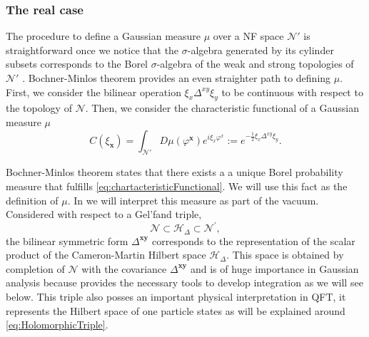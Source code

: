 \documentclass{elsarticle}%
\begin{document}
\subsubsection{The real case}
The procedure to define a Gaussian measure $\mu$ over a  NF space $\mathcal{N}'$ is straightforward once we notice that the $\sigma$-algebra generated by its cylinder subsets corresponds to the Borel $\sigma$-algebra of the weak and strong topologies of $\mathcal{N}'$  \cite{kuoWhiteNoise1996}. Bochner-Minlos theorem  \cite{hidaBrownianMotion1980,gelfandGeneralizedFunctions1964} provides an even straighter path to defining $\mu$.  First, we consider the bilinear operation ${\xi}_x\Delta^{xy}\xi_y$ to be continuous   with respect to the topology of $\mathcal{N}$.  Then, we consider the  characteristic functional of a Gaussian measure $\mu$
\begin{equation}
    \label{eq:chartacteristicFunctional}
        C(\xi_{\mathbf{x}})=\int_{\mathcal{N}'}D\mu(\varphi^{\mathbf{x}}) e^{i\xi_x\varphi^x} :=e^{-\frac{1}{2}{\xi}_x\Delta^{xy}\xi_y}.
\end{equation}

Bochner-Minlos theorem states that there exists a 
 a unique Borel probability measure that fulfills \eqref{eq:chartacteristicFunctional}. We will use this fact as the definition of $\mu$. In \cite{alonsoGeometricFlavours2024} we will interpret this measure as part of the vacuum.
Considered with respect to a Gel'fand triple,
$$
\mathcal{N}\subset \mathcal{H}_\Delta \subset \mathcal{N}^{\prime },
$$
the bilinear symmetric form $\Delta^{\mathbf{xy}}$ corresponds to the representation of the scalar product of the Cameron-Martin Hilbert space $\mathcal{H}_\Delta$.  This space is obtained by completion of $\mathcal{N}$ with the covariance $\Delta^{\mathbf{xy}}$ and is of huge importance in Gaussian analysis  because provides the necessary tools to develop integration as we will see below. This triple also posses an important physical interpretation in QFT, it represents the Hilbert space of one particle states as will be  explained around  \eqref{eq:HolomorphicTriple}.
\end{document}

